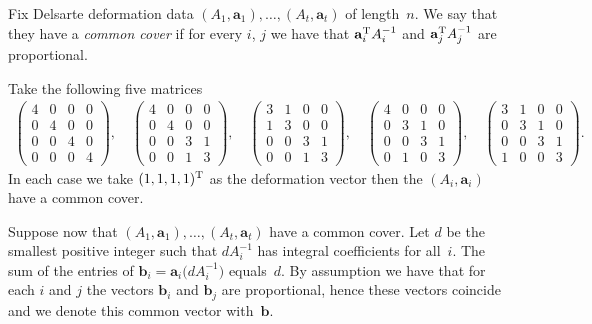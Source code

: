 \documentclass[11pt]{article}
\numberwithin{equation}{section}
\begin{document}
\begin{Definition}
Fix Delsarte deformation data $(A_1,\mathbf{a}_1), \dots, (A_t,\mathbf{a}_t)$ of length~$n$. We say that they have a \emph{common cover}
if for every $i$, $j$ we have that $\mathbf{a}^{\rm T}_i A_i^{-1}$ and $\mathbf{a}^{\rm T}_j A_j^{-1}$ are proportional.
\end{Definition}
\begin{Example} Take the following f\/ive matrices
\begin{gather*}
\left(\begin{matrix} 4&0&0&0\\0&4&0&0\\0&0&4&0\\0&0&0&4\end{matrix} \right)\!,\quad
\left(\begin{matrix} 4&0&0&0\\0&4&0&0\\0&0&3&1\\0&0&1&3\end{matrix} \right)\!,\quad
\left(\begin{matrix} 3&1&0&0\\1&3&0&0\\0&0&3&1\\0&0&1&3\end{matrix} \right)\!,\quad
\left(\begin{matrix} 4&0&0&0\\0&3&1&0\\0&0&3&1\\0&1&0&3\end{matrix} \right)\!,\quad
\left(\begin{matrix} 3&1&0&0\\0&3&1&0\\0&0&3&1\\1&0&0&3\end{matrix} \right)\!.
\end{gather*}
In each case we take $(1,1,1,1)^{\rm T}$ as the deformation vector then the $(A_i,\mathbf{a}_i)$ have a common cover.
\end{Example}

Suppose now that $(A_1,\mathbf{a}_1),\dots,(A_t,\mathbf{a}_t)$ have a common cover. Let $d$ be the smallest positive integer such that $dA_i^{-1}$ has integral coef\/f\/icients for all~$i$. The sum of the entries of $\mathbf{b}_i=\mathbf{a}_i \big(dA_i^{-1}\big)$ equals~$d$. By assumption we have that for each $i$ and $j$ the vectors $\mathbf{b}_i$ and $\mathbf{b}_j$ are proportional, hence these vectors coincide and we denote this common vector with~$\mathbf{b}$.
\end{document}
